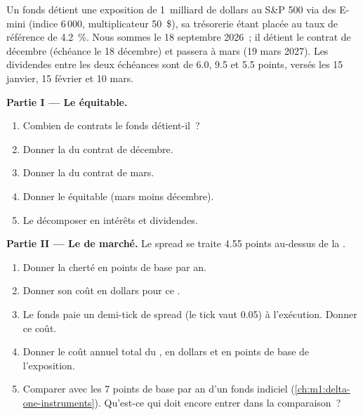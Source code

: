 \begin{problem}\label{pb:m1:basis-roll-and-delivery:1}
Un fonds détient une exposition de 1~milliard de dollars au S\&P 500 via des E-mini (indice 6\,000,
multiplicateur 50~\$), sa trésorerie étant placée au taux de référence de 4.2~\%. Nous sommes le 18
septembre 2026~; il détient le contrat de décembre (échéance le 18 décembre) et passera à
mars (19 mars 2027). Les dividendes entre les deux échéances sont de 6.0,
9.5 et 5.5 points, versés les 15 janvier, 15 février et 10 mars.

\medskip\noindent\textbf{Partie I --- Le  équitable.}
\begin{enumerate}
\item Combien de contrats le fonds détient-il~?
\item Donner la  du contrat de décembre.
\item Donner la  du contrat de mars.
\item Donner le  équitable (mars moins décembre).
\item Le décomposer en intérêts et dividendes.
\end{enumerate}

\medskip\noindent\textbf{Partie II --- Le  de marché.}
Le spread se traite 4.55 points au-dessus de la .
\begin{enumerate}[resume]
\item Donner la cherté en points de base par an.
\item Donner son coût en dollars pour ce .
\item Le fonds paie un demi-tick de spread (le tick vaut 0.05) à l'exécution.
Donner ce coût.
\item Donner le coût annuel total du , en dollars et en points de base
de l'exposition.
\item Comparer avec les 7 points de base par an d'un fonds indiciel
(\cref{ch:m1:delta-one-instruments}). Qu'est-ce qui doit encore entrer dans la comparaison~?
\end{enumerate}


\end{problem}
